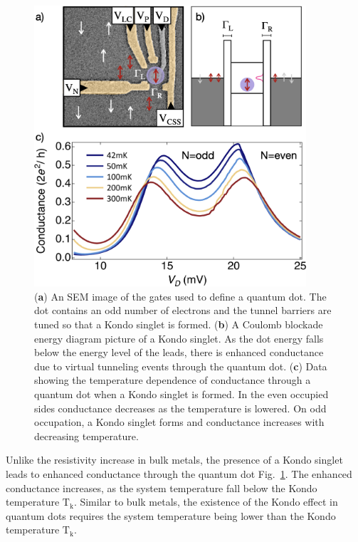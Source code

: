  \begin{figure}[!hbt]
  \begin{center}
    \includegraphics[width=0.9\textwidth]{figures/ch2/crop_FiguresMaster.011.png}
    \caption[Kondo effect in a quantum dot in the Kondo regime]{\label{fig:ch2/kondo_regime_conductance} 
    (\textbf{a}) An SEM image of the gates used to define a quantum dot. The dot contains an odd number of electrons and the tunnel barriers are tuned so that a Kondo singlet is formed. (\textbf{b}) A Coulomb blockade energy diagram picture of a Kondo singlet. As the dot energy falls below the energy level of the leads, there is enhanced conductance due to virtual tunneling events through the quantum dot. (\textbf{c}) Data showing the temperature dependence of conductance through a quantum dot when a Kondo singlet is formed. In the even occupied sides conductance decreases as the temperature is lowered. On odd occupation, a Kondo singlet forms and conductance increases with decreasing temperature.}
  \end{center}
\end{figure}



 Unlike the resistivity increase in bulk metals, the presence of a Kondo singlet leads to enhanced conductance through the quantum dot Fig.~\ref{fig:ch2/kondo_regime_conductance}. The enhanced conductance increases, as the system temperature fall below the Kondo temperature $\mathrm{T_k}$. Similar to bulk metals, the existence of the Kondo effect in quantum dots requires the system temperature being lower than the Kondo temperature $\mathrm{T_k}$. 

